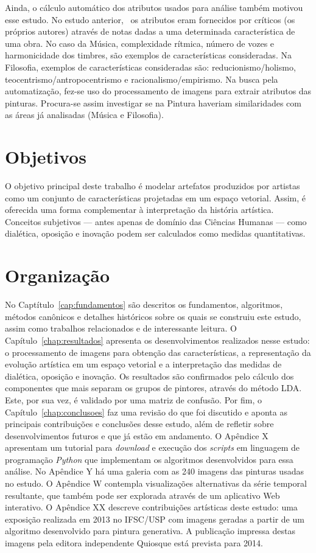 Ainda, o cálculo automático dos atributos usados para análise também
motivou esse estudo. No estudo anterior,~\cite{vieira} os atributos
eram fornecidos por críticos (os próprios autores) através de notas
dadas a uma determinada característica de uma obra. No caso da Música,
complexidade rítmica, número de vozes e harmonicidade dos timbres, são
exemplos de características consideradas. Na Filosofia, exemplos de
características consideradas são: reducionismo/holismo,
teocentrismo/antropocentrismo e racionalismo/empirismo. Na busca pela
automatização, fez-se uso do processamento de imagens para extrair
atributos das pinturas. Procura-se assim investigar se na Pintura
haveriam similaridades com as áreas já analisadas (Música e
Filosofia).

\section{Objetivos}

O objetivo principal deste trabalho é modelar artefatos produzidos por
artistas como um conjunto de características projetadas em um espaço
vetorial. Assim, é oferecida uma forma complementar à interpretação da
história artística. Conceitos subjetivos --- antes apenas de domínio
das Ciências Humanas --- como dialética, oposição e inovação podem ser
calculados como medidas quantitativas.

\section{Organização}

No Captítulo~\ref{cap:fundamentos} são descritos os fundamentos,
algoritmos, métodos canônicos e detalhes históricos sobre os quais se
construiu este estudo, assim como trabalhos relacionados e de
interessante leitura. O Capítulo~\ref{chap:resultados} apresenta os
desenvolvimentos realizados nesse estudo: o processamento de imagens
para obtenção das características, a representação da evolução
artística em um espaço vetorial e a interpretação das medidas de
dialética, oposição e inovação. Os resultados são confirmados pelo
cálculo dos componentes que mais separam os grupos de pintores,
através do método LDA. Este, por sua vez, é validado por uma matriz de
confusão. Por fim, o Capítulo~\ref{chap:conclusoes} faz uma revisão do
que foi discutido e aponta as principais contribuições e conclusões
desse estudo, além de refletir sobre desenvolvimentos futuros e que já
estão em andamento. O Apêndice X apresentam um tutorial
para \textit{download} e execução dos \textit{scripts} em linguagem de
programação \textit{Python} que implementam os algoritmos
desenvolvidos para essa análise. No Apêndice Y há uma galeria com as
240 imagens das pinturas usadas no estudo. O Apêndice W contempla
visualizações alternativas da série temporal resultante, que também
pode ser explorada através de um aplicativo Web interativo. O Apêndice
XX descreve contribuições artísticas deste estudo: uma exposição
realizada em 2013 no IFSC/USP com imagens geradas a partir de um
algoritmo desenvolvido para pintura generativa. A publicação impressa
destas imagens pela editora independente Quiosque está prevista para
2014.

